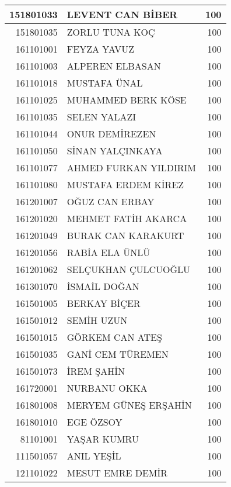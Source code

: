 \documentclass[12pt]{article}
\begin{document}
\begin{longtable}{||r||l||r||}
    \midrule
    151801033 & LEVENT CAN BİBER & 100 \\
    \midrule
    151801035 & ZORLU TUNA KOÇ & 100 \\
    \midrule
    161101001 & FEYZA YAVUZ & 100 \\
    \midrule
    161101003 & ALPEREN ELBASAN & 100 \\
    \midrule
    161101018 & MUSTAFA ÜNAL & 100 \\
    \midrule
    161101025 & MUHAMMED BERK KÖSE & 100 \\
    \midrule
    161101035 & SELEN YALAZI & 100 \\
    \midrule
    161101044 & ONUR DEMİREZEN & 100 \\
    \midrule
    161101050 & SİNAN YALÇINKAYA & 100 \\
    \midrule
    161101077 & AHMED FURKAN YILDIRIM & 100 \\
    \midrule
    161101080 & MUSTAFA ERDEM KİREZ & 100 \\
    \midrule
    161201007 & OĞUZ CAN ERBAY & 100 \\
    \midrule
    161201020 & MEHMET FATİH AKARCA & 100 \\
    \midrule
    161201049 & BURAK CAN KARAKURT & 100 \\
    \midrule
    161201056 & RABİA ELA ÜNLÜ & 100 \\
    \midrule
    161201062 & SELÇUKHAN ÇULCUOĞLU & 100 \\
    \midrule
    161301070 & İSMAİL DOĞAN & 100 \\
    \midrule
    161501005 & BERKAY BİÇER & 100 \\
    \midrule
    161501012 & SEMİH UZUN & 100 \\
    \midrule
    161501015 & GÖRKEM CAN ATEŞ & 100 \\
    \midrule
    161501035 & GANİ CEM TÜREMEN & 100 \\
    \midrule
    161501073 & İREM ŞAHİN & 100 \\
    \midrule
    161720001 & NURBANU OKKA & 100 \\
    \midrule
    161801008 & MERYEM GÜNEŞ ERŞAHİN & 100 \\
    \midrule
    161801010 & EGE ÖZSOY & 100 \\
    \midrule
    81101001 & YAŞAR KUMRU & 100 \\
    \midrule
    111501057 & ANIL YEŞİL & 100 \\
    \midrule
    121101022 & MESUT EMRE DEMİR & 100 \\

\end{longtable}
\end{document}

